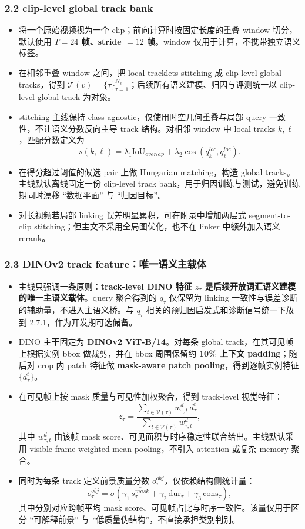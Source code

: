\documentclass[UTF8]{ctexart}
\begin{document}
\subsubsection*{2.2 clip-level global track bank}
\begin{itemize}
\item 将一个原始视频视为一个 clip；前向计算时按固定长度的重叠 window 切分，默认使用 \textbf{$T=24$ 帧、stride $=12$ 帧}。window 仅用于计算，不携带独立语义标签。
\item 在相邻重叠 window 之间，把 local tracklets stitching 成 clip-level global tracks，得到 $\mathcal T(v)=\{\tau\}_{\tau=1}^{N_v}$；后续所有语义建模、归因与评测统一以 clip-level global track 为对象。
\item stitching 主线保持 class-agnostic，仅使用时空几何重叠与局部 query 一致性，不让语义分数反向主导 track 结构。对相邻 window 中 local tracks $k,\ell$，匹配分数定义为
\[
 s(k,\ell)=\lambda_1 \overline{\mathrm{IoU}}_{overlap}+\lambda_2 \cos(q_k^{loc},q_\ell^{loc}).
\]
\item 在得分超过阈值的候选 pair 上做 Hungarian matching，构造 global tracks。主线默认离线固定一份 clip-level track bank，用于归因训练与测试，避免训练期同时漂移 ``数据平面'' 与 ``归因目标''。
\item 对长视频若局部 linking 误差明显累积，可在附录中增加两层式 segment-to-clip stitching；但主文不采用全局图优化，也不在 linker 中额外加入语义 rerank。
\end{itemize}

\subsubsection*{2.3 DINOv2 track feature：唯一语义主载体}
\begin{itemize}
\item 主线只强调一条原则：\textbf{track-level DINO 特征 $z_\tau$ 是后续开放词汇语义建模的唯一主语义载体}。query 聚合得到的 $q_\tau$ 仅保留为 linking 一致性与误差诊断的辅助量，不进入主语义桥。与 $q_\tau$ 相关的预归因启发式和诊断信号统一下放到 2.7.1，作为开发期可选储备。
\item DINO 主干固定为 \textbf{DINOv2 ViT-B/14}。对每条 global track，在其可见帧上根据实例 bbox 做裁剪，并在 bbox 周围保留约 \textbf{10\% 上下文 padding}；随后对 crop 内 patch 特征做 \textbf{mask-aware patch pooling}，得到逐帧实例特征 $\{d_\tau^t\}$。
\item 在可见帧上按 mask 质量与可见性加权聚合，得到 track-level 视觉特征：
\[
 z_\tau = \frac{\sum_{t\in \mathcal V(\tau)} w_{\tau,t}^{d}\, d_\tau^t}{\sum_{t\in \mathcal V(\tau)} w_{\tau,t}^{d}},
\]
其中 $w_{\tau,t}^{d}$ 由该帧 mask score、可见面积与时序稳定性联合给出。主线默认采用 visible-frame weighted mean pooling，不引入 attention 或复杂 memory 聚合。
\item 同时为每条 track 定义前景质量分数 $o_\tau^{obj}$，仅依赖结构侧统计量：
\[
 o_\tau^{obj} = \sigma\!\left(\gamma_1 \, \overline{s_\tau^{mask}} + \gamma_2 \,\mathrm{dur}_\tau + \gamma_3 \,\mathrm{cons}_\tau\right),
\]
其中分别对应跨帧平均 mask score、可见帧占比与时序一致性。该量仅用于区分 ``可解释前景'' 与 ``低质量伪结构''，不直接承担类别判别。
\end{itemize}
\end{document}
